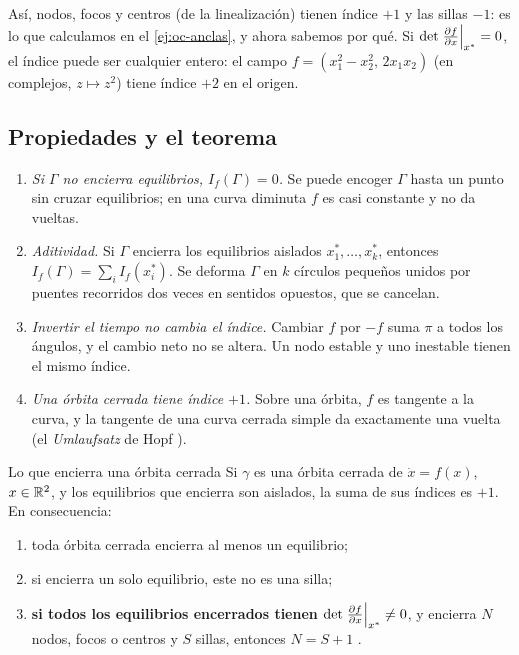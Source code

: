 Así, nodos, focos y centros (de la linealización) tienen índice $+1$ y las sillas $-1$: es lo que calculamos en el \cref{ej:oc-anclas}, y ahora sabemos por qué. Si $\det\left.\frac{\partial f}{\partial x}\right|_{x^{*}}=0$, el índice puede ser cualquier entero: el campo $f=(x_1^2-x_2^2,\,2x_1x_2)$ (en complejos, $z\mapsto z^2$) tiene índice $+2$ en el origen.

\subsection{Propiedades y el teorema}

\begin{enumerate}[label=(\roman*)]
  \item \emph{Si $\Gamma$ no encierra equilibrios, $I_f(\Gamma)=0$.} Se puede encoger $\Gamma$ hasta un punto sin cruzar equilibrios; en una curva diminuta $f$ es casi constante y no da vueltas.
  \item \emph{Aditividad.} Si $\Gamma$ encierra los equilibrios aislados $x_1^*,\dots,x_k^*$, entonces $I_f(\Gamma)=\sum_iI_f(x_i^*)$. Se deforma $\Gamma$ en $k$ círculos pequeños unidos por puentes recorridos dos veces en sentidos opuestos, que se cancelan.
  \item \emph{Invertir el tiempo no cambia el índice.} Cambiar $f$ por $-f$ suma $\pi$ a todos los ángulos, y el cambio neto no se altera. Un nodo estable y uno inestable tienen el mismo índice.
  \item \emph{Una órbita cerrada tiene índice $+1$.} Sobre una órbita, $f$ es tangente a la curva, y la tangente de una curva cerrada simple da exactamente una vuelta (el \emph{Umlaufsatz} de Hopf \citep{Hop35}).
\end{enumerate}

\begin{teorema}[label=thm:oc-indice]{Lo que encierra una órbita cerrada}
Si $\gamma$ es una órbita cerrada de $\dot x=f(x)$, $x\in\mathbb{R}^2$, y los equilibrios que encierra son aislados, la suma de sus índices es $+1$. En consecuencia:
\begin{enumerate}
  \item toda órbita cerrada encierra al menos un equilibrio;
  \item si encierra un solo equilibrio, este no es una silla;
  \item \textbf{si todos los equilibrios encerrados tienen $\det\left.\frac{\partial f}{\partial x}\right|_{x^{*}}\neq0$}, y encierra $N$ nodos, focos o centros y $S$ sillas, entonces $N=S+1$ \citep[corolario~2.1]{Kha02}.
\end{enumerate}
\end{teorema}

